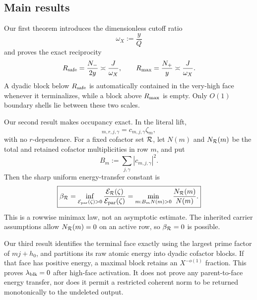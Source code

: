 \subsection{Main results}

Our first theorem introduces the dimensionless cutoff ratio
\begin{equation}
 \omega_X:=\frac yQ
 \label{eq:tpc59-intro-omega}
\end{equation}
and proves the exact reciprocity
\begin{equation}
 R_{\rm safe}=\frac{N_-}{2y}\asymp\frac J{\omega_X},
 \qquad
 R_{\rm max}=\frac{N_+}{y}\asymp\frac J{\omega_X}.
 \label{eq:tpc59-intro-reciprocity}
\end{equation}
A dyadic block below \(R_{\rm safe}\) is automatically contained in the
very-high face whenever it terminalizes, while a block above
\(R_{\rm max}\) is empty.  Only \(O(1)\) boundary shells lie between these
two scales.

Our second result makes occupancy exact.  In the literal lift,
\begin{equation}
 [G_X^L]_{m,r,j,\gamma}=c_{m,j,\gamma}\zeta_m,
 \label{eq:tpc59-intro-row-factorization}
\end{equation}
with no \(r\)-dependence.  For a fixed cofactor set \(\mathcal R\), let
\(N(m)\) and \(N_{\mathcal R}(m)\) be the total and retained cofactor
multiplicities in row \(m\), and put
\begin{equation}
 B_m:=\sum_{j,\gamma}|c_{m,j,\gamma}|^2.
 \label{eq:tpc59-intro-Bm}
\end{equation}
Then the sharp uniform energy-transfer constant is
\begin{equation}
 \boxed{
 \beta_{\mathcal R}
 =\inf_{\mathcal E_{\rm par}(\zeta)>0}
   \frac{\mathcal E_{\mathcal R}(\zeta)}{\mathcal E_{\rm par}(\zeta)}
 =\min_{m:B_mN(m)>0}\frac{N_{\mathcal R}(m)}{N(m)}.}
 \label{eq:tpc59-intro-beta}
\end{equation}
This is a rowwise minimax law, not an asymptotic estimate.  The inherited
carrier assumptions allow \(N_{\mathcal R}(m)=0\) on an active row, so
\(\beta_{\mathcal R}=0\) is possible.

Our third result identifies the terminal face exactly using the largest
prime factor of \(mj+h_0\), and partitions its raw atomic energy into
dyadic cofactor blocks.  If that face has positive energy, a maximal block
retains an \(X^{-o(1)}\) fraction.  This proves
\(\lambda_{\rm blk}=0\) after high-face activation.  It does not prove
any parent-to-face energy transfer, nor does it permit a restricted
coherent norm to be returned monotonically to the undeleted output.

